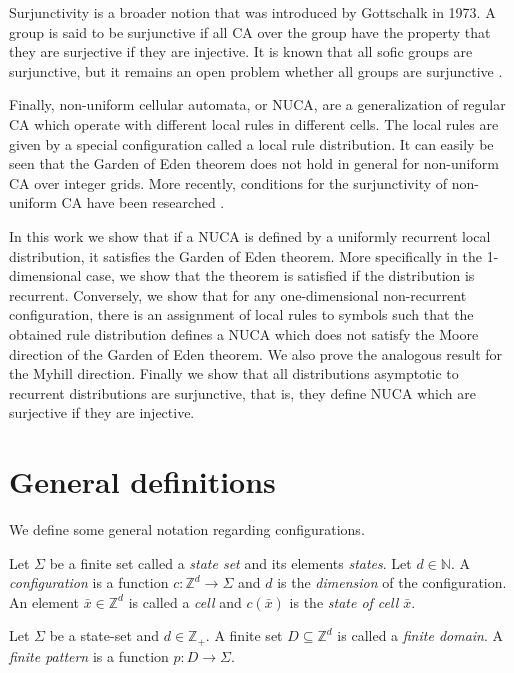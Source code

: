 \documentclass[runningheads]{llncs}
\newcommand{\N}{\mathbb{N}}
\newcommand{\Z}{\mathbb{Z}}
\begin{document}
Surjunctivity is a broader notion that was introduced by Gottschalk in 1973. A group is said to be surjunctive if all CA over the group have the property that they are surjective if they are injective. It is known that all sofic groups are surjunctive, but it remains an open problem whether all groups are surjunctive \cite{gottschalk,cecc}.

Finally, non-uniform cellular automata, or NUCA, are a generalization of regular CA which operate with different local rules in different cells. The local rules are given by a special configuration called a local rule distribution. It can easily be seen that the Garden of Eden theorem does not hold in general for non-uniform CA over integer grids. More recently, conditions for the surjunctivity of non-uniform CA have been researched \cite{sipper,dennuz,phung}.

In this work we show that if a NUCA is defined by a uniformly recurrent local distribution, it satisfies the Garden of Eden theorem. More specifically in the 1-dimensional case, we show that the theorem is satisfied if the distribution is recurrent. Conversely, we show that for any one-dimensional non-recurrent configuration, there is an assignment of local rules to symbols such that the obtained rule distribution defines a NUCA which does not satisfy the Moore direction of the Garden of Eden theorem. We also prove the analogous result for the Myhill direction. Finally we show that all distributions asymptotic to recurrent distributions are surjunctive, that is, they define NUCA which are surjective if they are injective.

\section{General definitions}

We define some general notation regarding configurations.

\begin{definition}
Let $\Sigma$ be a finite set called a \emph{state set} and its elements \emph{states}. Let $d\in \N$. A \emph{configuration} is a function $c:\Z^d \rightarrow \Sigma$ and $d$ is the \emph{dimension} of the configuration. An element $\bar x \in \Z^d$ is called a \emph{cell} and $c(\bar x)$ is the \emph{state of cell $\bar x$}.
\end{definition}

\begin{definition}
Let $\Sigma$ be a state-set and $d \in \Z_+$. A finite set $D \subseteq \Z^d$ is called a \emph{finite domain}. A \emph{finite pattern} is a function $p:D\rightarrow \Sigma$.
\end{definition}
\end{document}
